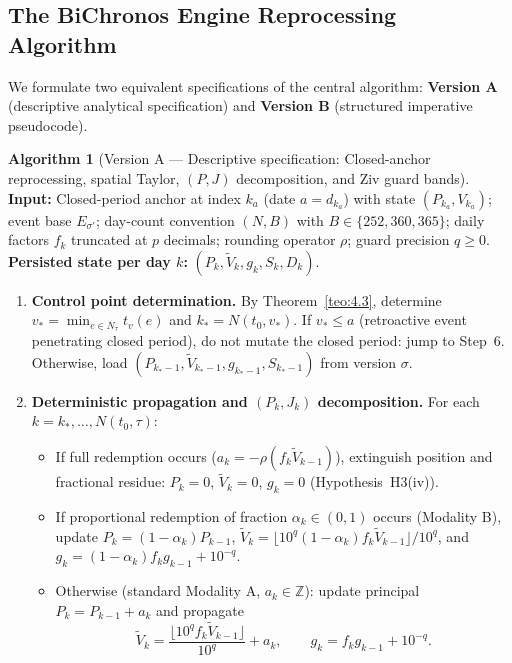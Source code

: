 \documentclass[11pt, a4paper]{article}
\theoremstyle{definition}
\newtheorem{algoritmo}[definicao]{Algorithm}
\theoremstyle{plain}
\theoremstyle{remark}
\begin{document}
\subsection{The BiChronos Engine Reprocessing Algorithm}\label{sec:5.6}

We formulate two equivalent specifications of the central algorithm: \textbf{Version A} (descriptive analytical specification) and \textbf{Version B} (structured imperative pseudocode).

\begin{algoritmo}[Version A — Descriptive specification: Closed-anchor reprocessing, spatial Taylor, \texorpdfstring{$(P, J)$}{(P, J)} decomposition, and Ziv guard bands]\label{alg:5.14}
\textbf{Input:} Closed-period anchor at index $k_a$ (date $a = d_{k_a}$) with state $(P_{k_a}, V_{k_a})$; event base $E_{\sigma'}$; day-count convention $(N, B)$ with $B \in \{252, 360, 365\}$; daily factors $f_k$ truncated at $p$ decimals; rounding operator $\rho$; guard precision $q \ge 0$. \textbf{Persisted state per day $k$:} $(P_k, \tilde{V}_k, g_k, S_k, D_k)$.
\begin{enumerate}[label=\textbf{\arabic*.}]
    \item \textbf{Control point determination.} By Theorem~\ref{teo:4.3}, determine $v_* = \min_{e \in N_\tau} t_v(e)$ and $k_* = N(t_0, v_*)$. If $v_* \le a$ (retroactive event penetrating closed period), do not mutate the closed period: jump to Step~6. Otherwise, load $(P_{k_* - 1}, \tilde{V}_{k_* - 1}, g_{k_* - 1}, S_{k_* - 1})$ from version $\sigma$.
    \item \textbf{Deterministic propagation and \texorpdfstring{$(P_k, J_k)$}{(Pk, Jk)} decomposition.} For each $k = k_*, \dots, N(t_0, \tau)$:
    \begin{itemize}
        \item If full redemption occurs ($a_k = -\rho(f_k \tilde{V}_{k-1})$), extinguish position and fractional residue: $P_k = 0$, $\tilde{V}_k = 0$, $g_k = 0$ (Hypothesis~H3(iv)).
        \item If proportional redemption of fraction $\alpha_k \in (0, 1)$ occurs (Modality B), update $P_k = (1 - \alpha_k)P_{k-1}$, $\tilde{V}_k = \lfloor 10^q (1 - \alpha_k) f_k \tilde{V}_{k-1} \rfloor / 10^q$, and $g_k = (1 - \alpha_k)f_k g_{k-1} + 10^{-q}$.
        \item Otherwise (standard Modality A, $a_k \in \mathbb{Z}$): update principal $P_k = P_{k-1} + a_k$ and propagate
        \[
        \tilde{V}_k = \frac{\lfloor 10^q f_k \tilde{V}_{k-1} \rfloor}{10^q} + a_k, \qquad g_k = f_k g_{k-1} + 10^{-q}.
\]
\end{itemize}
\end{enumerate}
\end{algoritmo}
\end{document}
